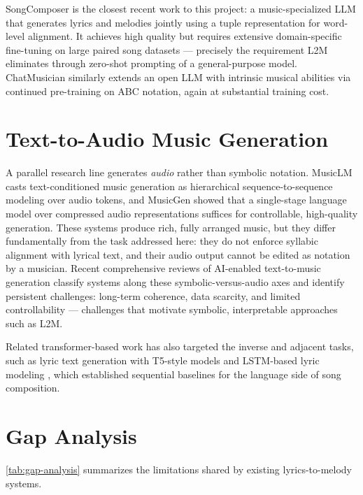 SongComposer \cite{ding24songcomposer} is the closest recent work to this
project: a music-specialized LLM that generates lyrics and melodies jointly
using a tuple representation for word-level alignment. It achieves high
quality but requires extensive domain-specific fine-tuning on large paired
song datasets --- precisely the requirement L2M eliminates through zero-shot
prompting of a general-purpose model. ChatMusician \cite{yuan24chatmusician}
similarly extends an open LLM with intrinsic musical abilities via continued
pre-training on ABC notation, again at substantial training cost.

\section{Text-to-Audio Music Generation}
\label{sec:lr-tta}

A parallel research line generates \emph{audio} rather than symbolic
notation. MusicLM \cite{agostinelli23musiclm} casts text-conditioned music
generation as hierarchical sequence-to-sequence modeling over audio tokens,
and MusicGen \cite{copet23musicgen} showed that a single-stage language
model over compressed audio representations suffices for controllable,
high-quality generation. These systems produce rich, fully arranged music,
but they differ fundamentally from the task addressed here: they do not
enforce syllabic alignment with lyrical text, and their audio output cannot
be edited as notation by a musician. Recent comprehensive reviews of
AI-enabled text-to-music generation \cite{li25review} classify systems along
these symbolic-versus-audio axes and identify persistent challenges:
long-term coherence, data scarcity, and limited controllability ---
challenges that motivate symbolic, interpretable approaches such as L2M.

Related transformer-based work has also targeted the inverse and adjacent
tasks, such as lyric text generation with T5-style models
\cite{mediakov24lyrics} and LSTM-based lyric modeling \cite{gill20lyric},
which established sequential baselines for the language side of song
composition.

\section{Gap Analysis}
\label{sec:lr-gap}

\ref{tab:gap-analysis} summarizes the limitations shared by existing
lyrics-to-melody systems.

